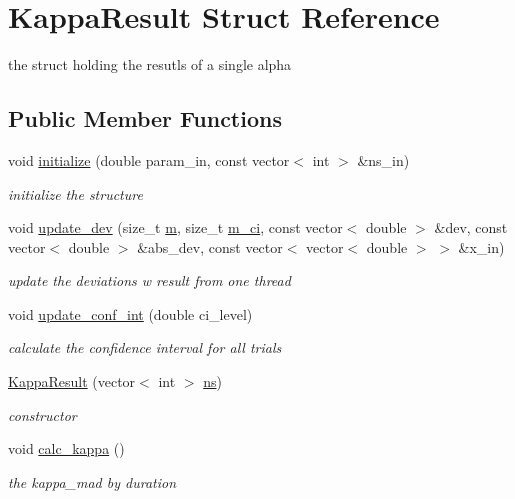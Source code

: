 \hypertarget{structKappaResult}{}\section{Kappa\+Result Struct Reference}
\label{structKappaResult}


the struct holding the resutls of a single alpha  


\subsection*{Public Member Functions}
\begin{DoxyCompactItemize}
\item 
void \mbox{\hyperlink{structKappaResult_a73d7fdfa72149f5ec74b22a203f418b9}{initialize}} (double param\+\_\+in, const vector$<$ int $>$ \&ns\+\_\+in)
\begin{DoxyCompactList}\small\item\em initialize the structure \end{DoxyCompactList}\item 
void \mbox{\hyperlink{structKappaResult_ad9a40b7ecb6f56e1e868fd559e07026f}{update\+\_\+dev}} (size\+\_\+t \mbox{\hyperlink{structKappaResult_a5d2264180cefdfefd364065aaf405b72}{m}}, size\+\_\+t \mbox{\hyperlink{structKappaResult_a59f858c0abe9db0eebd82a56665b38df}{m\+\_\+ci}}, const vector$<$ double $>$ \&dev, const vector$<$ double $>$ \&abs\+\_\+dev, const vector$<$ vector$<$ double $>$ $>$ \&x\+\_\+in)
\begin{DoxyCompactList}\small\item\em update the deviations w result from one thread \end{DoxyCompactList}\item 
void \mbox{\hyperlink{structKappaResult_a8dd8b127d34165637298435377489cff}{update\+\_\+conf\+\_\+int}} (double ci\+\_\+level)
\begin{DoxyCompactList}\small\item\em calculate the confidence interval for all trials \end{DoxyCompactList}\item 
\mbox{\hyperlink{structKappaResult_ac0ca82b62ef4f9717ab9e136b251668b}{Kappa\+Result}} (vector$<$ int $>$ \mbox{\hyperlink{structKappaResult_a48d379e6c356ee537839917a67a21c86}{ns}})
\begin{DoxyCompactList}\small\item\em constructor \end{DoxyCompactList}\item 
void \mbox{\hyperlink{structKappaResult_a54228c60b4691f2b1621aa07b1e0437f}{calc\+\_\+kappa}} ()
\begin{DoxyCompactList}\small\item\em the kappa\+\_\+mad by duration \end{DoxyCompactList}\end{DoxyCompactItemize}
